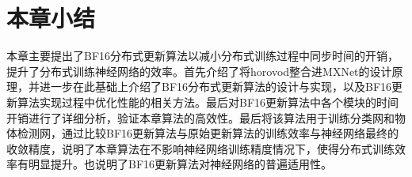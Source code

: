 \section{本章小结}
本章主要提出了BF16分布式更新算法以减小分布式训练过程中同步时间的开销，提升了分布式训练神经网络的效率。首先介绍了将horovod整合进MXNet的设计原理，并进一步在此基础上介绍了BF16分布式更新算法的设计与实现，以及BF16更新算法实现过程中优化性能的相关方法。最后对BF16更新算法中各个模块的时间开销进行了详细分析，验证本章算法的高效性。最后将该算法用于训练分类网和物体检测网，通过比较BF16更新算法与原始更新算法的训练效率与神经网络最终的收敛精度，说明了本章算法在不影响神经网络训练精度情况下，使得分布式训练效率有明显提升。也说明了BF16更新算法对神经网络的普遍适用性。

